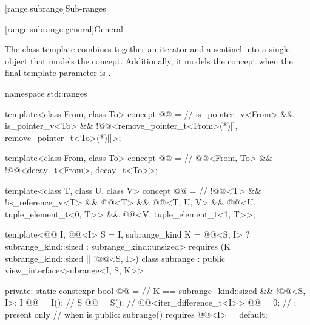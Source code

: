 [range.subrange]{Sub-ranges}

[range.subrange.general]{General}

\pnum
The  class template combines together an
iterator and a sentinel into a single object that models the
 concept. Additionally, it models the
 concept when the final template parameter is
.

%
\begin{codeblock}
namespace std::ranges {
  template<class From, class To>
    concept @@ =      // \expos
      is_pointer_v<From> && is_pointer_v<To> &&
      !@@<remove_pointer_t<From>(*)[], remove_pointer_t<To>(*)[]>;

  template<class From, class To>
    concept @@ =                    // \expos
      @@<From, To> &&
      !@@<decay_t<From>, decay_t<To>>;

  template<class T, class U, class V>
    concept @@ =                    // \expos
      !@@<T> && !is_reference_v<T> && @@<T> &&
      @@<T, U, V> &&
      @@<U, tuple_element_t<0, T>> &&
      @@<V, tuple_element_t<1, T>>;

  template<@@ I, @@<I> S = I, subrange_kind K =
      @@<S, I> ? subrange_kind::sized : subrange_kind::unsized>
    requires (K == subrange_kind::sized || !@@<S, I>)
  class subrange : public view_interface<subrange<I, S, K>> {
  private:
    static constexpr bool @@ =                       // \expos
      K == subrange_kind::sized && !@@<S, I>;
    I @@ = I();                                         // \expos
    S @@ = S();                                           // \expos
    @@<iter_difference_t<I>> @@ = 0;   // \expos; present only
                                                            // when  is 
  public:
    subrange() requires @@<I> = default;

}}
\end{codeblock}
